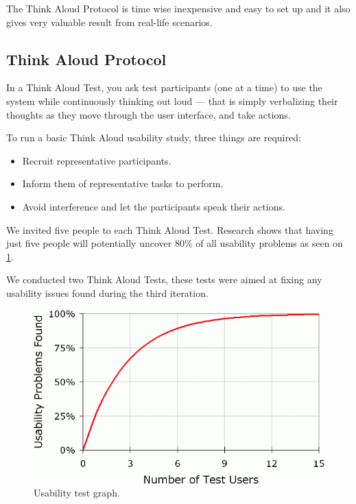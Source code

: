 The Think Aloud Protocol is time wise inexpensive and easy to set up and it also gives very valuable result from real-life scenarios.

\subsection{Think Aloud Protocol}
In a Think Aloud Test, you ask test participants (one at a time) to use the system while continuously thinking out loud --- that is  simply verbalizing their thoughts as they move through the user interface, and take actions.

To run a basic Think Aloud usability study, three things are required:

\begin{itemize}
\item Recruit representative participants.
\item Inform them of representative tasks to perform.
\item Avoid interference and let the participants speak their actions.
\end{itemize}

We invited five people to each Think Aloud Test. Research shows that having just five people will potentially uncover 80\% of all usability problems \cite{jakobnielsen2000fiveusers} as seen on \ref{fig:usabilitycurve}.

We conducted two Think Aloud Tests, these tests were aimed at fixing any usability issues found during the third iteration.

\begin{figure}[ht]
\centering
\includegraphics[width=\columnwidth]{usabilitycurve.png}
\caption{Usability test graph.}
\label{fig:usabilitycurve}
\end{figure}


